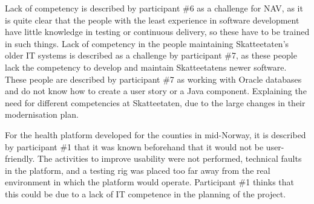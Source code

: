 Lack of competency is described by participant \#6 as a challenge for NAV, as it is quite clear that the people with the least experience in software development have little knowledge in testing or continuous delivery, so these have to be trained in such things. Lack of competency in the people maintaining Skatteetaten's older IT systems is described as a challenge by participant \#7, as these people lack the competency to develop and maintain Skatteetatens newer software. These people are described by participant \#7 as working with Oracle databases and do not know how to create a user story or a Java component. Explaining the need for different competencies at Skatteetaten, due to the large changes in their modernisation plan.




For the health platform developed for the counties in mid-Norway, it is described by participant \#1 that it was known beforehand that it would not be user-friendly. The activities to improve usability were not performed, technical faults in the platform, and a testing rig was placed too far away from the real environment in which the platform would operate. Participant \#1 thinks that this could be due to a lack of IT competence in the planning of the project.



